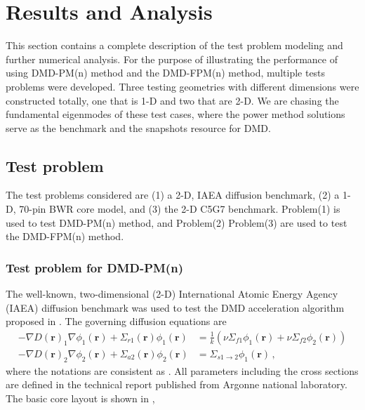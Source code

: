 \cleardoublepage

\chapter{Results and Analysis}
\label{chapter:results}
This section contains a complete description of the test problem modeling and further numerical analysis.
For the purpose of illustrating the performance of using DMD-PM(n) method and the DMD-FPM(n) method, multiple tests problems were developed. 
Three testing geometries with different dimensions were constructed totally, one that is 1-D and two that are 2-D.
We are chasing the fundamental eigenmodes of these test cases, where the power method solutions serve as the benchmark and the snapshots resource for DMD. 

\section{Test problem}
The test problems considered are (1) a 2-D, IAEA diffusion benchmark, (2) a 1-D, 70-pin BWR core model, and (3) the 2-D C5G7 benchmark.
Problem(1) is used to test DMD-PM(n) method, and Problem(2) Problem(3) are used to test the DMD-FPM(n) method.
\subsection{Test problem for DMD-PM(n)}
The well-known, two-dimensional (2-D) International Atomic Energy Agency (IAEA) diffusion benchmark was used to test the DMD acceleration algorithm proposed in .
The governing diffusion equations are
\begin{equation}
 \begin{split}
  -\nabla D(\mathbf{r})_1 \nabla \phi_1 (\mathbf{r}) + \Sigma_{r1}(\mathbf{r}) \phi_1 (\mathbf{r}) 
    &= \frac{1}{k} \left (\nu\Sigma_{f1}\phi_1(\mathbf{r}) + \nu\Sigma_{f2}\phi_2(\mathbf{r}) \right ) \\
 -\nabla D(\mathbf{r})_2 \nabla \phi_2 (\mathbf{r}) + \Sigma_{a2}(\mathbf{r}) \phi_2 (\mathbf{r}) 
    &= \Sigma_{s1\to 2}\phi_1(\mathbf{r}) \, ,
 \end{split}
 \label{eq:twogroupdiff}
\end{equation}
where the notations are consistent as .
All parameters including the cross sections are defined in the technical report published from Argonne national laboratory\cite{center1977benchmark}.
The basic core layout is shown in ,

